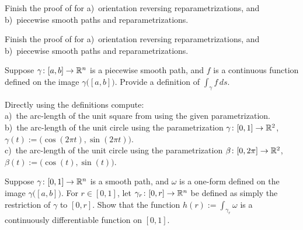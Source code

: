 
\begin{exercise} \label{mv:exercise:pathpiece}
Finish the proof of 
for a)~orientation reversing reparametrizations, and b)~piecewise smooth paths
and reparametrizations.
\end{exercise}

\begin{exercise} \label{mv:exercise:linepiece}
Finish the proof of 
for a)~orientation reversing reparametrizations, and b)~piecewise smooth paths
and reparametrizations.
\end{exercise}

\begin{exercise}
Suppose $\gamma \colon [a,b] \to {\mathbb{R}}^n$ is a piecewise smooth path, and $f$ is a
continuous function defined on the image $\gamma\bigl([a,b]\bigr)$.
Provide a definition of $\int_{\gamma} f \,ds$.
\end{exercise}

\begin{exercise}
Directly using the definitions compute:\\
a)~the arc-length of the unit square from
 using the given parametrization.
\\
b)~the arc-length of the unit circle using the parametrization
$\gamma \colon [0,1] \to {\mathbb{R}}^2$, $\gamma(t) := \bigl(\cos(2\pi t),\sin(2\pi t)\bigr)$.
\\
c)~the arc-length of the unit circle using the parametrization
$\beta \colon [0,2\pi] \to {\mathbb{R}}^2$, $\beta(t) := \bigl(\cos(t),\sin(t)\bigr)$.
\end{exercise}

\begin{exercise}
Suppose $\gamma \colon [0,1] \to {\mathbb{R}}^n$ is a smooth path, and
$\omega$ is a one-form defined on the image $\gamma\bigl([a,b]\bigr)$.
For $r \in [0,1]$, let $\gamma_r \colon [0,r] \to {\mathbb{R}}^n$ be defined
as simply the restriction of $\gamma$ to $[0,r]$.  Show that the
function $h(r) := \int_{\gamma_r} \omega$ is a continuously
differentiable function on $[0,1]$.
\end{exercise}

